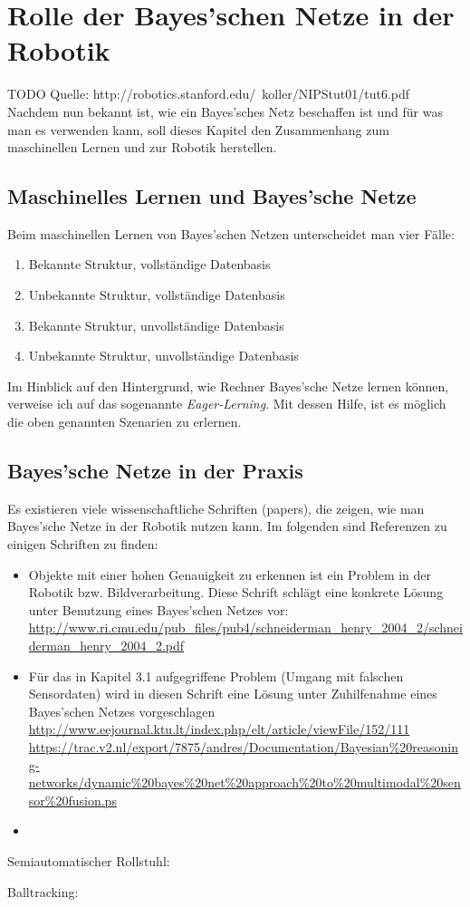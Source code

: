 \chapter{Rolle der Bayes'schen Netze in der Robotik}
TODO Quelle: http://robotics.stanford.edu/~koller/NIPStut01/tut6.pdf
Nachdem nun bekannt ist, wie ein Bayes'sches Netz beschaffen ist und für was man es verwenden kann, soll dieses Kapitel den Zusammenhang zum maschinellen Lernen und zur Robotik herstellen.
\section{Maschinelles Lernen und Bayes'sche Netze}
Beim maschinellen Lernen von Bayes'schen Netzen unterscheidet man vier Fälle:
\begin{enumerate}

\item Bekannte Struktur, vollständige Datenbasis
\item Unbekannte Struktur, vollständige Datenbasis
\item Bekannte Struktur, unvollständige Datenbasis 
\item Unbekannte Struktur, unvollständige Datenbasis
\end{enumerate}

Im Hinblick auf den Hintergrund, wie Rechner Bayes'sche Netze lernen können, verweise ich auf das sogenannte \textit{Eager-Lerning}. Mit dessen Hilfe, ist es möglich die oben genannten Szenarien zu erlernen. 

\section{Bayes'sche Netze in der Praxis}
Es existieren viele wissenschaftliche Schriften (papers), die zeigen, wie man Bayes'sche Netze in der Robotik nutzen kann. Im folgenden sind Referenzen zu einigen Schriften zu finden:
\begin{itemize}
\item Objekte mit einer hohen Genauigkeit zu erkennen ist ein Problem in der Robotik bzw. Bildverarbeitung. Diese Schrift schlägt eine konkrete Lösung unter Benutzung eines Bayes'schen Netzes vor: \url{http://www.ri.cmu.edu/pub_files/pub4/schneiderman_henry_2004_2/schneiderman_henry_2004_2.pdf}
\item Für das in Kapitel 3.1 aufgegriffene Problem (Umgang mit falschen Sensordaten) wird in diesen Schrift eine Lösung unter Zuhilfenahme eines Bayes'schen Netzes vorgeschlagen \subitem \url{http://www.eejournal.ktu.lt/index.php/elt/article/viewFile/152/111} 
\subitem \url{https://trac.v2.nl/export/7875/andres/Documentation/Bayesian%20reasoning-networks/dynamic%20bayes%20net%20approach%20to%20multimodal%20sensor%20fusion.ps}
\item 
\end{itemize}



Semiautomatischer Rollstuhl:

Balltracking:



